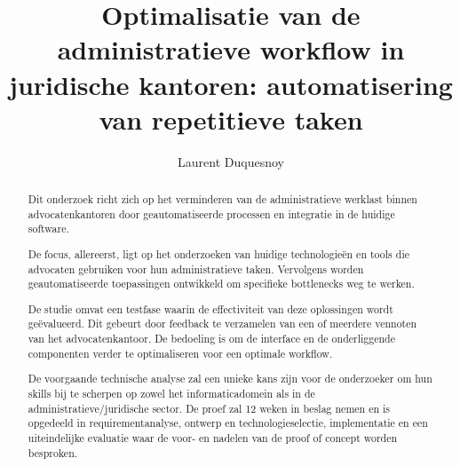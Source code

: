 \documentclass{hogent-article}
\title{Optimalisatie van de administratieve workflow in juridische kantoren: automatisering van repetitieve taken}
\author{Laurent Duquesnoy}
\begin{document}
\begin{abstract}
  Dit onderzoek richt zich op het verminderen van de administratieve werklast binnen advocatenkantoren door geautomatiseerde processen en integratie in de huidige software. 

  De focus, allereerst, ligt op het onderzoeken van huidige technologieën en tools die advocaten gebruiken voor hun administratieve taken. Vervolgens worden geautomatiseerde toepassingen ontwikkeld om specifieke bottlenecks weg te werken. 

  De studie omvat een testfase waarin de effectiviteit van deze oplossingen wordt geëvalueerd. Dit gebeurt door feedback te verzamelen van een of meerdere vennoten van het advocatenkantoor. De bedoeling is om de interface en de onderliggende componenten verder te optimaliseren voor een optimale workflow. 

  De voorgaande technische analyse zal een unieke kans zijn voor de onderzoeker om hun skills bij te scherpen op zowel het informaticadomein als in de administratieve/juridische sector. De proef zal 12 weken in beslag nemen en is opgedeeld in requirementanalyse, ontwerp en technologieselectie, implementatie en een uiteindelijke evaluatie waar de voor- en nadelen van de proof of concept worden besproken. 
\end{abstract}
\tableofcontents



\printbibliography[heading=bibintoc]
\end{document}
